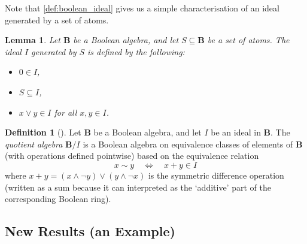 \documentclass{article}
\newtheorem{lemma}{Lemma}
\theoremstyle{definition}
\newtheorem{definition}{Definition}
\theoremstyle{remark}
\begin{document}
Note that \cref{def:boolean_ideal} gives us a simple characterisation of an
ideal generated by a set of atoms.

\begin{lemma}
  Let $\mathbf{B}$ be a Boolean algebra, and let $S \subseteq \mathbf{B}$ be a
  set of atoms. The ideal $I$ generated by $S$ is defined by the following:
  \begin{itemize}
  \item $0 \in I$,
  \item $S \subseteq I$,
  \item $x \lor y \in I$ for all $x, y \in I$.
  \end{itemize}
\end{lemma}

\begin{definition}[\cite{givant2008introduction}]
  Let $\mathbf{B}$ be a Boolean algebra, and let $I$ be an ideal in
  $\mathbf{B}$. The \emph{quotient algebra} $\mathbf{B}/I$ is a Boolean algebra
  on equivalence classes of elements of $\mathbf{B}$ (with operations defined
  pointwise) based on the equivalence relation
  \[
    x \sim y \quad \iff \quad x + y \in I
  \]
  where $x + y = (x \land \neg y) \lor (y \land \neg x)$ is the symmetric
  difference operation (written as a sum because it can interpreted as the
  `additive' part of the corresponding Boolean ring).
\end{definition}

\subsection{New Results (an Example)}
\end{document}
